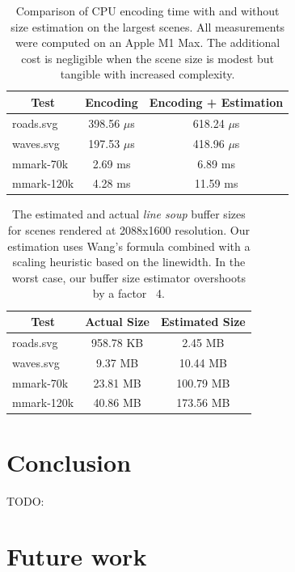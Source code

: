 \documentclass[sigconf, authordraft]{acmart}
\begin{document}
\begin{table}
    \caption{Comparison of CPU encoding time with and without size estimation on the largest scenes. All measurements were computed on an Apple M1 Max. The additional cost is negligible when the scene size is modest but tangible with increased complexity.}
    \begin{tabular}{|l|c|c|}
    \hline
        \multicolumn{1}{|c|}{\textbf{Test}} & \textbf{Encoding} & \textbf{Encoding + Estimation} \\
    \hline
        roads.svg  & 398.56 $\mu$s & 618.24 $\mu$s \\
        waves.svg  & 197.53 $\mu$s & 418.96 $\mu$s \\
        mmark-70k  & 2.69 ms       & 6.89 ms       \\
        mmark-120k & 4.28 ms       & 11.59 ms      \\
    \hline
    \end{tabular}
    \label{table:bump-estimate-cost}
\end{table}

\begin{table}
    \caption{The estimated and actual \emph{line soup} buffer sizes for scenes rendered at 2088x1600 resolution. Our estimation uses Wang's formula combined with a scaling heuristic based on the linewidth. In the worst case, our buffer size estimator overshoots by a factor ~4.}
    \begin{tabular}{|l|c|c|}
    \hline
        \multicolumn{1}{|c|}{\textbf{Test}} & Actual Size & Estimated Size \\
    \hline
        roads.svg  & 958.78 KB & 2.45 MB    \\
        waves.svg  & 9.37 MB   & 10.44 MB   \\
        mmark-70k  & 23.81 MB  & 100.79 MB  \\
        mmark-120k & 40.86 MB  & 173.56 MB  \\
    \hline
    \end{tabular}
    \label{table:bump-estimate-mem}
\end{table}

\section{Conclusion}

TODO:

\section{Future work}
\end{document}
